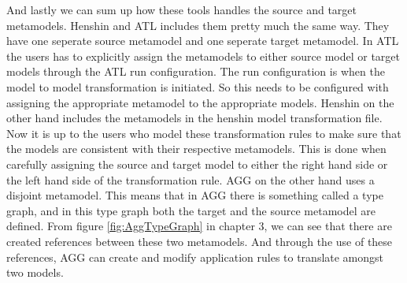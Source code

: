 \documentclass[pdftex,11pt,a4paper]{article}
\begin{document}
And lastly we can sum up how these tools handles the source and target
metamodels. Henshin and ATL includes them pretty much the same way. They have
one seperate source metamodel and one seperate target metamodel. In ATL the
users has to explicitly assign the metamodels to either source model or target
models through the ATL run configuration. The run configuration is when the
model to model transformation is initiated. So this needs to be configured with
assigning the appropriate metamodel to the appropriate models. Henshin on the
other hand includes the metamodels in the henshin model transformation file. Now
it is up to the users who model these transformation rules to make sure that the
models are consistent with their respective metamodels. This is done when
carefully assigning the source and target model to either the right hand side or
the left hand side of the transformation rule. AGG on the other hand uses a
disjoint metamodel. This means that in AGG there is something called a type
graph, and in this type graph both the target and the source metamodel are
defined. From figure \ref{fig:AggTypeGraph} in chapter 3, we can see that there
are created references between these two metamodels. And through the use of
these references, AGG can create and modify application rules to translate
amongst two models.

\noindent 

 

\end{document}
